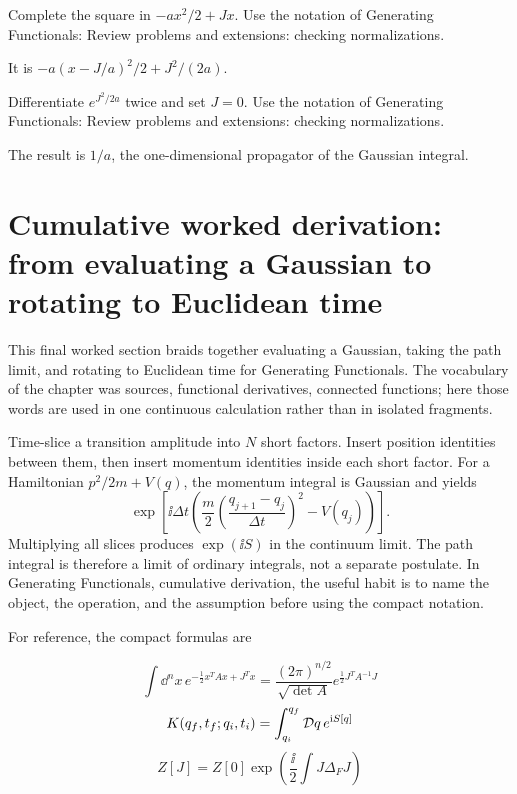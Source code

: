 \begin{exercise}
Complete the square in \(-ax^2/2+Jx\).  Use the notation of Generating Functionals: Review problems and extensions: checking normalizations.
\begin{answer}
It is \(-a(x-J/a)^2/2+J^2/(2a)\).
\end{answer}
\end{exercise}

\begin{exercise}
Differentiate \(e^{J^2/2a}\) twice and set \(J=0\).  Use the notation of Generating Functionals: Review problems and extensions: checking normalizations.
\begin{answer}
The result is \(1/a\), the one-dimensional propagator of the Gaussian integral.
\end{answer}
\end{exercise}



\section{Cumulative worked derivation: from evaluating a Gaussian to rotating to Euclidean time}

This final worked section braids together evaluating a Gaussian, taking the path limit, and rotating to Euclidean time for Generating Functionals.  The vocabulary of the chapter was sources, functional derivatives, connected functions; here those words are used in one continuous calculation rather than in isolated fragments.

Time-slice a transition amplitude into \(N\) short factors.  Insert position identities between them, then insert momentum identities inside each short factor.  For a Hamiltonian \(p^2/2m+V(q)\), the momentum integral is Gaussian and yields
\[
  \exp\left[\ii\Delta t\left(
  \frac{m}{2}\left(\frac{q_{j+1}-q_j}{\Delta t}\right)^2-V(q_j)
  \right)\right].
\]
Multiplying all slices produces \(\exp(\ii S)\) in the continuum limit.  The path integral is therefore a limit of ordinary integrals, not a separate postulate.  In Generating Functionals, cumulative derivation, the useful habit is to name the object, the operation, and the assumption before using the compact notation.

For reference, the compact formulas are

\[
  \int\dd^n x\,e^{-\frac12x^TAx+J^Tx}=\frac{(2\pi)^{n/2}}{\sqrt{\det A}}e^{\frac12J^TA^{-1}J}
\]
\[
  K(q_f,t_f;q_i,t_i)=\int_{q_i}^{q_f}\mathcal D q\,e^{\mathrm i S[q]}
\]
\[
  Z[J]=Z[0]\exp\left(\frac{\ii}{2}\int J\Delta_FJ\right)
\]

